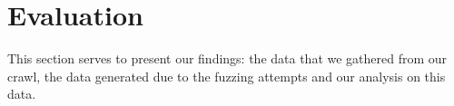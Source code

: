 \section{Evaluation}
This section serves to present our findings: the data that we gathered from our crawl, the data generated due to the fuzzing attempts and our analysis on this data.







